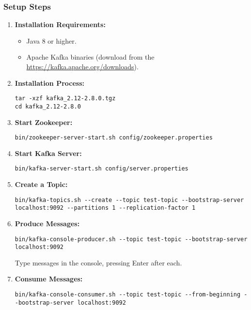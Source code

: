 \documentclass[aspectratio=169]{beamer}
\begin{document}
\begin{frame}[fragile]
    \frametitle{Setup Steps}
    \begin{enumerate}
        \item \textbf{Installation Requirements:}
        \begin{itemize}
            \item Java 8 or higher.
            \item Apache Kafka binaries (download from the \url{https://kafka.apache.org/downloads}).
        \end{itemize}

        \item \textbf{Installation Process:}
        \begin{lstlisting}
tar -xzf kafka_2.12-2.8.0.tgz
cd kafka_2.12-2.8.0
        \end{lstlisting}

        \item \textbf{Start Zookeeper:}
        \begin{lstlisting}
bin/zookeeper-server-start.sh config/zookeeper.properties
        \end{lstlisting}

        \item \textbf{Start Kafka Server:}
        \begin{lstlisting}
bin/kafka-server-start.sh config/server.properties
        \end{lstlisting}

        \item \textbf{Create a Topic:}
        \begin{lstlisting}
bin/kafka-topics.sh --create --topic test-topic --bootstrap-server localhost:9092 --partitions 1 --replication-factor 1
        \end{lstlisting}

        \item \textbf{Produce Messages:}
        \begin{lstlisting}
bin/kafka-console-producer.sh --topic test-topic --bootstrap-server localhost:9092
        \end{lstlisting}
        Type messages in the console, pressing Enter after each.

        \item \textbf{Consume Messages:}
        \begin{lstlisting}
bin/kafka-console-consumer.sh --topic test-topic --from-beginning --bootstrap-server localhost:9092
        \end{lstlisting}
    \end{enumerate}
\end{frame}
\end{document}
